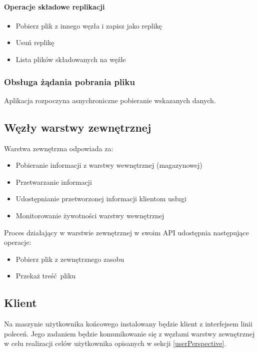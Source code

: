 \documentclass[a4paper,11pt]{article}
\begin{document}
\paragraph{Operacje składowe replikacji}
\begin{itemize}
  \item Pobierz plik z innego węzła i zapisz jako replikę
  \item Usuń replikę
  \item Lista plików składowanych na węźle
\end{itemize}

\subsubsection{Obsługa żądania pobrania pliku}
Aplikacja rozpoczyna asnychroniczne pobieranie wskazanych danych.

\subsection{Węzły warstwy zewnętrznej}
Warstwa zewnętrzna odpowiada za:
\begin{itemize}
  \item Pobieranie informacji z warstwy wewnętrznej (magazynowej)
  \item Przetwarzanie informacji
  \item Udostępnianie przetworzonej informacji klientom usługi
  \item Monitorowanie żywotności warstwy wewnętrznej
\end{itemize}

Proces działający w warstwie zewnętrznej w swoim API udostępnia
następujące operacje:
\begin{itemize}
  \item Pobierz plik z zewnętrznego zasobu
  \item Przekaż treść pliku
\end{itemize}

%
%

\subsection{Klient}
Na maszynie użytkownika końcowego instalowany będzie klient z
interfejsem linii poleceń.  Jego zadaniem będzie komunikowanie się z
węzłami warstwy zewnętrznej w celu realizacji celów użytkownika
opisanych w sekcji \ref{userPerspective}.
\end{document}
